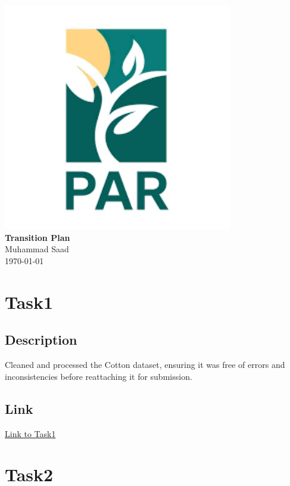 \documentclass[12pt]{article}
\begin{document}
\begin{titlepage}
    \centering
    \vspace*{\fill} %
    \includegraphics[width=10cm]{img/logo2.png}\\[1cm] %
    {\Large \textbf{Transition Plan}}\\[0.5cm]
    {\large Muhammad Saad}\\[0.2cm]
    {\large \today}\\[0.5cm]
    \vspace*{\fill}
\end{titlepage}

\newpage
\tableofcontents
\newpage

\section{Task1}
\subsection{Description}
Cleaned and processed the Cotton dataset, ensuring it was free of errors and inconsistencies before reattaching it for submission.

\subsection{Link}
\href{https://github.com/msaadg/PAR-Project/tree/main/Task1}{Link to Task1}

\section{Task2}
\end{document}
